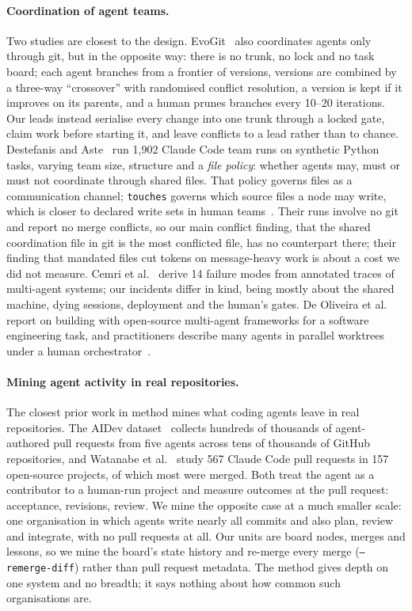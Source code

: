 \documentclass[11pt]{article}
\newcommand{\code}[1]{\texttt{#1}}
\begin{document}
\paragraph{Coordination of agent teams.}
Two studies are closest to the design. EvoGit~\citep{huang2025evogit} also coordinates
agents only through git, but in the opposite way: there is no trunk, no lock and no task
board; each agent branches from a frontier of versions, versions are combined by a
three-way ``crossover'' with randomised conflict resolution, a version is kept if it
improves on its parents, and a human prunes branches every 10--20 iterations. Our leads
instead serialise every change into one trunk through a locked gate, claim work before
starting it, and leave conflicts to a lead rather than to chance. Destefanis and
Aste~\citep{destefanis2026coordinate} run 1,902 Claude Code team runs on synthetic Python
tasks, varying team size, structure and a \emph{file policy}: whether agents may, must or
must not coordinate through shared files. That policy governs files as a communication
channel; \code{touches} governs which source files a node may write, which is closer to
declared write sets in human teams~\citep{kasi2013cassandra}. Their runs involve no git
and report no merge conflicts, so our main conflict finding, that the shared coordination
file in git is the most conflicted file, has no counterpart there; their finding that
mandated files cut tokens on message-heavy work is about a cost we did not measure. Cemri
et al.~\citep{cemri2025mast} derive 14 failure modes from annotated traces of multi-agent
systems; our incidents differ in kind, being mostly about the shared machine, dying
sessions, deployment and the human's gates. De Oliveira et al.~\citep{oliveira2026masexperience}
report on building with open-source multi-agent frameworks for a software engineering
task, and practitioners describe many agents in parallel worktrees under a human
orchestrator~\citep{mason2026agents}.

\paragraph{Mining agent activity in real repositories.}
The closest prior work in method mines what coding agents leave in real repositories. The
AIDev dataset~\citep{li2025aiteammates,li2026aidev} collects hundreds of thousands of
agent-authored pull requests from five agents across tens of thousands of GitHub
repositories, and Watanabe et al.~\citep{watanabe2025agentic} study 567 Claude Code pull
requests in 157 open-source projects, of which most were merged. Both treat the agent as a
contributor to a human-run project and measure outcomes at the pull request: acceptance,
revisions, review. We mine the opposite case at a much smaller scale: one organisation in
which agents write nearly all commits and also plan, review and integrate, with no pull
requests at all. Our units are board nodes, merges and lessons, so we mine the board's
state history and re-merge every merge (\code{--remerge-diff}) rather than pull request
metadata. The method gives depth on one system and no breadth; it says nothing about how
common such organisations are.
\end{document}
